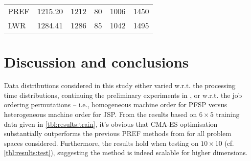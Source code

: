 \documentclass[graybox]{svmult}
\begin{document}
\begin{table}[]
{\begin{tabular}{lrrrrr}
            PREF&  1215.20 & 1212 & 80 & 1006 & 1450  \\ %
            LWR &  1284.41 & 1286 & 85 & 1042 & 1495   \\ %
            \bottomrule \end{tabular}}
    \quad
    \quad
    
\end{table}

\section{Discussion and conclusions}\label{sec:disc}
Data distributions considered in this study either varied 
w.r.t. the processing time distributions, continuing the preliminary 
experiments in  \cite{InRu11a} , or 
w.r.t. the job ordering permutations -- i.e., homogeneous machine order for 
PFSP versus heterogeneous machine order for JSP. 
From the results based on $6\times5$ training data given  in 
\cref{tbl:results:train}, it's obvious that CMA-ES optimisation substantially 
outperforms the previous PREF methods from \cite{InRu11a} for all problem 
spaces considered. Furthermore, the results hold when testing on $10\times10$ 
(cf. \cref{tbl:results:test}), suggesting the method is indeed  scalable for 
higher dimensions. 
\end{document}
